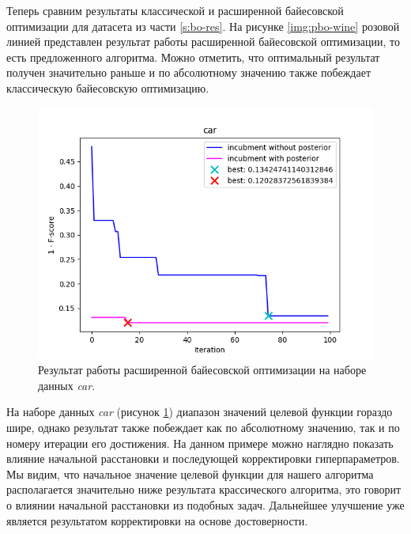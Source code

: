 \documentclass[times,specification,annotation]{itmo-student-thesis}
\begin{document}
	Теперь сравним результаты классической и расширенной байесовской оптимизации для датасета из части \ref{s:bo-res}. 
	На рисунке \ref{img:pbo-wine} розовой линией представлен результат работы расширенной байесовской оптимизации, то есть предложенного алгоритма. Можно отметить, что оптимальный результат получен значительно раньше и по абсолютному значению также побеждает классическую байесовскую оптимизацию. 
	\begin{figure}[!ht]
		\caption{Результат работы расширенной байесовской оптимизации на наборе данных \textit{car}.}\label{img:pbo-car}
		\includegraphics[width=0.85\linewidth]{../png/incubment-iteration-posterior/car}
		\centering
	\end{figure}
	На наборе данных \textit{car} (рисунок \ref{img:pbo-car}) диапазон значений целевой функции гораздо шире, однако результат также побеждает как по абсолютному значению, так и по номеру итерации его достижения. На данном примере можно наглядно показать влияние начальной расстановки и последующей корректировки гиперпараметров. Мы видим, что начальное значение целевой функции для нашего алгоритма располагается значительно ниже результата крассического алгоритма, это говорит о влиянии начальной расстановки из подобных задач. Дальнейшее улучшение уже является результатом корректировки на основе достоверности. \par 
	
\end{document}
